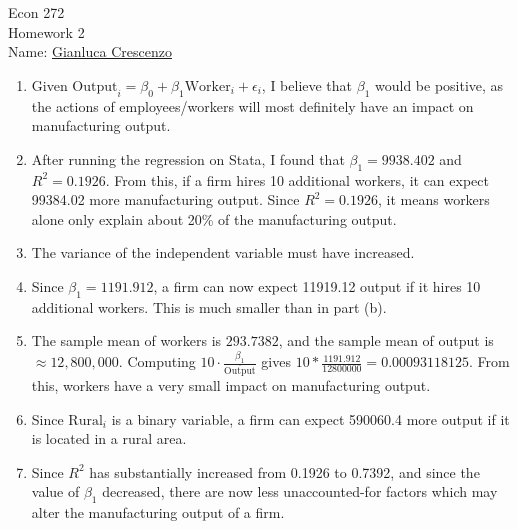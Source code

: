 \documentclass[11pt,twoside,openany]{memoir}
\begin{document}
\begin{center}
{\large Econ 272 \\[0.1in]Homework 2 \\[0.1in]}
{Name:} {\underline{Gianluca Crescenzo\hspace*{2in}}}\\[0.15in]
\end{center}
\vspace{4pt}
    \begin{question}
        \phantom{a}
        \begin{enumerate}[label = (\alph*),itemsep=1pt,topsep=3pt]
            \item Given $\text{Output}_i = \beta_0 + \beta_1 \text{Worker}_i + \epsilon_i$, I believe that $\beta_1$ would be positive, as the actions of employees/workers will most definitely have an impact on manufacturing output.
            \item After running the regression on Stata, I found that $\beta_1 = 9938.402$ and $R^2 = 0.1926$. From this, if a firm hires 10 additional workers, it can expect 99384.02 more manufacturing output. Since $R^2 = 0.1926$, it means workers alone only explain about 20\% of the manufacturing output.
            \item The variance of the independent variable must have increased.
            \item Since $\beta_1 = 1191.912$, a firm can now expect 11919.12 output if it hires 10 additional workers. This is much smaller than in part (b).
            \item  The sample mean of workers is $293.7382$, and the sample mean of output is $\approx12,800,000$. Computing $10\cdot \frac{\beta_1}{\overline{\text{Output}}}$ gives $10 * \frac{1191.912}{12800000} = 0.00093118125$. From this, workers have a very small impact on manufacturing output.
            \item Since $\text{Rural}_i$ is a binary variable, a firm can expect 590060.4 more output if it is located in a rural area.
            \item Since $R^2$ has substantially increased from 0.1926 to 0.7392, and since the value of $\beta_1$ decreased, there are now less unaccounted-for factors which may alter the manufacturing output of a firm.
        \end{enumerate}
    \end{question}
\end{document}
